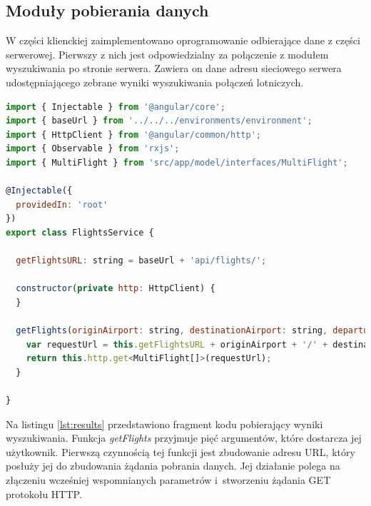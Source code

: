 \documentclass[12pt, twoside]{report}
\begin{document}
\subsection{Moduły pobierania danych}
W części klienckiej zaimplementowano oprogramowanie odbierające dane z części serwerowej. Pierwszy z nich jest odpowiedzialny za połączenie z modułem wyszukiwania po stronie serwera. Zawiera on dane adresu sieciowego serwera udostępniającego zebrane wyniki wyszukiwania połączeń lotniczych.
\begin{lstlisting}[language=JavaScript, caption= Kod źródłowy funkcji pobierającej wyniki z serwera, label=lst:results]
import { Injectable } from '@angular/core';
import { baseUrl } from '../../../environments/environment';
import { HttpClient } from '@angular/common/http';
import { Observable } from 'rxjs';
import { MultiFlight } from 'src/app/model/interfaces/MultiFlight';

@Injectable({
  providedIn: 'root'
})
export class FlightsService {

  getFlightsURL: string = baseUrl + 'api/flights/';

  constructor(private http: HttpClient) {
  }

  getFlights(originAirport: string, destinationAirport: string, departureDate: string, typeOfConnection: string, currency: string) : Observable<MultiFlight[]>{
    var requestUrl = this.getFlightsURL + originAirport + '/' + destinationAirport + '/' + departureDate + '/' + typeOfConnection + '/' + currency;
    return this.http.get<MultiFlight[]>(requestUrl);   
  }

}
\end{lstlisting}
Na listingu \ref{lst:results} przedstawiono fragment kodu pobierający wyniki wyszukiwania. Funkcja \textit{getFlights} przyjmuje pięć argumentów, które dostarcza jej użytkownik. Pierwszą czynnością tej funkcji jest zbudowanie adresu URL, który posłuży jej do zbudowania żądania pobrania danych. Jej działanie polega na złączeniu wcześniej wspomnianych parametrów i~stworzeniu żądania GET protokołu HTTP.
\end{document}
